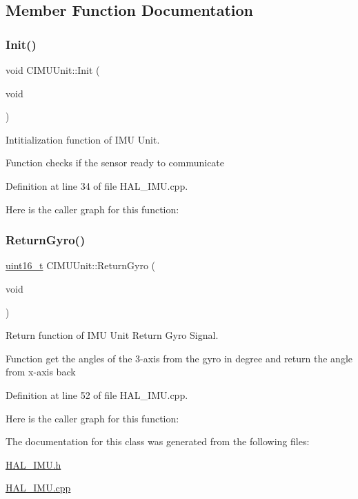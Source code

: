 \subsection{Member Function Documentation}
\mbox{\label{class_c_i_m_u_unit_a589ccc2afbaadbdf9dbef34c5025a42f}} 
\subsubsection{\texorpdfstring{Init()}{Init()}}
{\footnotesize\ttfamily void C\+I\+M\+U\+Unit\+::\+Init (\begin{DoxyParamCaption}\item[{void}]{ }\end{DoxyParamCaption})}



Intitialization function of I\+MU Unit. 

Function checks if the sensor ready to communicate 

Definition at line 34 of file H\+A\+L\+\_\+\+I\+M\+U.\+cpp.

Here is the caller graph for this function\+:
\mbox{\label{class_c_i_m_u_unit_a396b045fac007e169289409ca213ac39}} 
\subsubsection{\texorpdfstring{ReturnGyro()}{ReturnGyro()}}
{\footnotesize\ttfamily \mbox{\hyperlink{_a_d_a_s___types_8h_a1f1825b69244eb3ad2c7165ddc99c956}{uint16\+\_\+t}} C\+I\+M\+U\+Unit\+::\+Return\+Gyro (\begin{DoxyParamCaption}\item[{void}]{ }\end{DoxyParamCaption})}



Return function of I\+MU Unit Return Gyro Signal. 

Function get the angles of the 3-\/axis from the gyro in degree and return the angle from x-\/axis back 

Definition at line 52 of file H\+A\+L\+\_\+\+I\+M\+U.\+cpp.

Here is the caller graph for this function\+:


The documentation for this class was generated from the following files\+:\begin{DoxyCompactItemize}
\item 
\mbox{\hyperlink{_h_a_l___i_m_u_8h}{H\+A\+L\+\_\+\+I\+M\+U.\+h}}\item 
\mbox{\hyperlink{_h_a_l___i_m_u_8cpp}{H\+A\+L\+\_\+\+I\+M\+U.\+cpp}}\end{DoxyCompactItemize}
